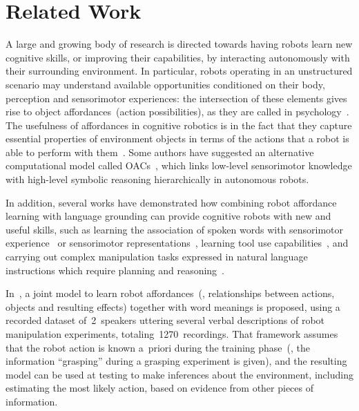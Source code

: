 
\section{Related Work}

A large and growing body of research is directed towards having robots learn new cognitive skills, or improving their capabilities, by interacting autonomously with their surrounding environment. In particular, robots operating in an unstructured scenario may understand available opportunities conditioned on their body, perception and sensorimotor experiences: the intersection of these elements gives rise to object affordances~(action possibilities), as they are called in psychology~\cite{gibson:2014}. The usefulness of affordances in cognitive robotics is in the fact that they capture essential properties of environment objects in terms of the actions that a robot is able to perform with them~\cite{montesano:2008,jamone:2016:tcds}.
Some authors have suggested an alternative computational model called \acp{OAC}~\cite{kruger:2011:ras}, which links low-level sensorimotor knowledge with high-level symbolic reasoning hierarchically in autonomous robots.

In addition, several works have demonstrated how combining robot affordance learning with language grounding can provide cognitive robots with new and useful skills, such as learning the association of spoken words with sensorimotor experience~\cite{salvi:2012:smcb,morse:2016:cogsci} or sensorimotor representations~\cite{stramandinoli:2016:icdl}, learning tool use capabilities~\cite{goncalves:2014:icarsc,goncalves:2014:icdl}, and carrying out complex manipulation tasks expressed in natural language instructions which require planning and reasoning~\cite{antunes:2016:icra}.

In~\cite{salvi:2012:smcb}, a joint model to learn robot affordances~(\ie, relationships between actions, objects and resulting effects) together with word meanings is proposed, using a recorded dataset of~2~speakers uttering several verbal descriptions of robot manipulation experiments, totaling~1270~recordings. That framework assumes that the robot action is known a~priori during the training phase~(\eg, the information ``grasping'' during a grasping experiment is given), and the resulting model can be used at testing to make inferences about the environment, including estimating the most likely action, based on evidence from other pieces of information.

